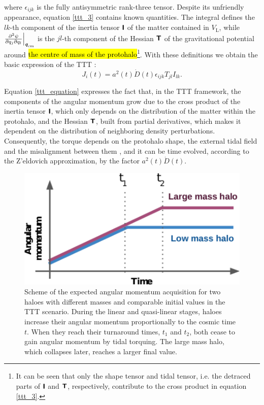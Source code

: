 \documentclass[fleqn,usenatbib]{mnras}
\begin{document}
where $\epsilon_{ijk}$ is the fully antisymmetric rank-three tensor. Despite its unfriendly appearance, equation \eqref{ttt_3} contains known quantities. The integral defines the $lk$-th component of the inertia tensor $\textbf{\textsf{I}}$ of the matter contained in $V_\mathrm{L}$, while $\frac{\partial^2 \psi}{\partial q_j\partial q_l} \Big|_{\textbf{\textit{q}}_\mathrm{cm}}$ is the $jl$-th component of the Hessian $\textbf{\textsf{T}}$ of the gravitational potential around \hl{the centre of mass of the protohalo}\footnote{It can be seen that only the shape tensor and tidal tensor, i.e. the detraced parts of $\textbf{\textsf{I}}$ and $\textbf{\textsf{T}}$, respectively, contribute to the cross product in equation \eqref{ttt_3}.}. With these definitions we obtain the basic expression of the TTT \citep{white1984}:
\begin{equation}
\label{ttt_equation}
J_i(t) = a^2(t)\dot{D}(t)\epsilon_{ijk}T_{jl}I_{lk}.
\end{equation}

Equation \eqref{ttt_equation} expresses the fact that, in the TTT framework, the components of the angular momentum grow due to the cross product of the inertia tensor $\textbf{\textsf{I}}$, which only depends on the distribution of the matter within the protohalo, and the Hessian $\textbf{\textsf{T}}$, built from partial derivatives, which makes it dependent on the distribution of neighboring density perturbations. Consequently, the torque depends on the protohalo shape, the external tidal field and the {misalignment} between them \citep{porcianietal2002a}, and it can be time evolved, according to the Z'eldovich approximation, by the factor $a^2(t)\dot{D}(t)$. 

\begin{figure}
\includegraphics[width=\columnwidth]{400Mpc_figs/ta_comparison.pdf}
\caption{Scheme of the expected angular momentum acquisition for two haloes with different masses and comparable initial values in the TTT scenario. During the linear and quasi-linear stages, haloes increase their angular momentum proportionally to the cosmic time $t$. When they reach their turnaround times, $t_1$ and $t_2$, both cease to gain angular momentum by tidal torquing. The large mass halo, which collapses later, reaches a larger final value.}
\label{fig:ta_comparison}
\end{figure}
\end{document}
